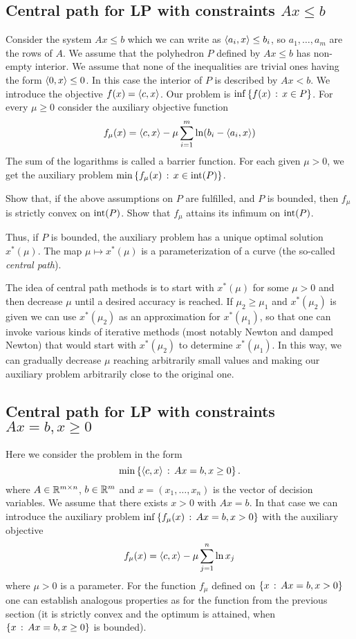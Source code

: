 \subsection{Central path for LP with constraints $Ax \le b$}

Consider the system $A x \le b$ which we can write as $\left\langle a_i , x \right\rangle \le b_i$, so $a_1,\ldots,a_m$ are the rows of $A$. We assume that the polyhedron $P$ defined by $A x \le b$ has non-empty interior. We assume that none of the inequalities are trivial ones having the form $\left\langle 0 , x \right\rangle \le 0$. In this case the interior of $P$ is described by $A x < b$. We introduce the objective $f(x) = \left\langle c , x \right\rangle$. Our problem is $\inf \left\{ f(x) \,:\, x \in P \right\}$. For every $\mu \ge 0$ consider the auxiliary objective function 
\[
	f_\mu(x) = \left\langle c , x \right\rangle - \mu \sum_{i=1}^m \ln(b_i- \left\langle a_i , x \right\rangle)
\]
The sum of the logarithms is called a barrier function. For each given $\mu> 0$, we get the auxiliary problem $\min \left\{ f_\mu(x) \,:\, x \in \operatorname{int}(P) \right\}$. 

\begin{exercise}
	Show that, if the above assumptions on $P$ are fulfilled, and $P$ is bounded, then $f_\mu$ is strictly convex on $\operatorname{int}(P)$. Show that $f_\mu$ attains its infimum on $\operatorname{int}(P)$. 
\end{exercise}

Thus, if $P$ is bounded, the auxiliary problem has a unique optimal solution $x^\ast(\mu)$. The map $\mu \mapsto x^\ast(\mu)$ is a parameterization of a curve (the so-called \emph{central path}). 

The idea of central path methods is to start with $x^\ast(\mu)$ for some $\mu>0$ and then decrease $\mu$ until a desired accuracy is reached. If $\mu_2 \ge \mu_1$ and $x^\ast(\mu_2)$ is given we can use $x^\ast(\mu_2)$ as an approximation for $x^\ast(\mu_1)$, so that one can invoke various kinds of iterative methods (most notably Newton and damped Newton) that would start with $x^\ast(\mu_2)$ to determine $x^\ast(\mu_1)$. In this way, we can gradually decrease $\mu$ reaching arbitrarily small values and making our auxiliary problem arbitrarily close to the original one.

\subsection{Central path for LP with constraints $Ax=b, x \ge 0$}

Here we consider the problem in the form 
\[
	\min \left\{ \left\langle c , x \right\rangle \,:\, A x = b, x \ge 0 \right\}.
\]
where $A \in \mathbb{R}^{m \times n}$, $b \in \mathbb{R}^m$ and $x=(x_1,\ldots,x_n)$ is the vector of decision variables.
We assume that there exists $x > 0$ with $A x =b$. In that case we can introduce the auxiliary  problem $\inf \left\{ f_\mu(x) \,:\, A x= b, x > 0 \right\}$ with the auxiliary objective 
\[
	f_\mu(x) = \left\langle c , x \right\rangle - \mu \sum_{j=1}^n \ln x_j
\]
where $\mu>0$ is a parameter. For the function $f_\mu$ defined on $\left\{ x \,:\, A x =b, x >0 \right\}$ one can establish analogous properties as for the function from the previous section (it is strictly convex and the optimum is attained, when $\left\{ x \,:\, A x=b,x \ge 0 \right\}$ is bounded). 

